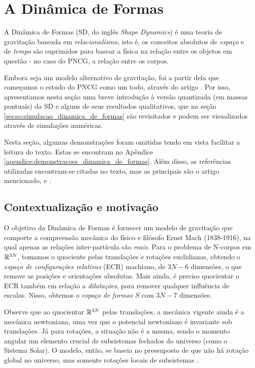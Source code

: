 \section{A Dinâmica de Formas}\label{secao:dinamica_de_formas}
A Dinâmica de Formas (SD, do inglês \textit{Shape Dynamics}) é uma teoria de gravitação baseada em \textit{relacionalismo}, isto é, os conceitos absolutos de \textit{espaço} e de \textit{tempo} são suprimidos para basear a física na relação entre os objetos em questão - no caso do PNCG, a relação entre os corpos.

Embora seja um modelo alternativo de gravitação, foi a partir dela que começamos o estudo do PNCG como um todo, através do artigo \cite{Barbour2014_identification}. Por isso, apresentamos nesta seção uma breve introdução à versão quantizada (em massas pontuais) da SD e alguns de seus resultados qualitativos, que na seção \ref{secao:simulacao_dinamica_de_formas} são revisitados e podem ser visualizados através de simulações numéricas.

Nesta seção, algumas demonstrações foram omitidas tendo em vista facilitar a leitura do texto. Estas se encontram no Apêndice \ref{apendice:demonstracoes_dinamica_de_formas}. Além disso, as referências utilizadas encontram-se citadas no texto, mas as principais são o artigo mencionado, \cite{barbour2013_gravitationaloriginarrowstime} e \cite{Barbour2014_solution}.

\subsection{Contextualização e motivação}

O objetivo da Dinâmica de Formas é fornecer um modelo de gravitação que comporte a compreensão mecânica do físico e filósofo Ernst Mach (1838-1916), na qual apenas as relações inter-partícula são \textit{reais}. Para o problema de N-corpos em $\mathbb{R}^{3N}$, tomamos o quociente pelas translações e rotações euclidianas, obtendo o \textit{espaço de configurações relativas} (ECR) machiano, de $3N-6$ dimensões, o que remove as posições e orientações absolutas. Mais ainda, é preciso quocientar o ECR também em relação a \textit{dilatações}, para remover qualquer influência de escalas. Nisso, obtemos o \textit{espaço de formas} $S$ com $3N-7$ dimensões. 

Observe que ao quocientar $\mathbb{R}^{3N}$ pelas translações, a mecânica vigente ainda é a mecânica newtoniana, uma vez que o potencial newtoniano é invariante sob translações. Já para rotações, a situação não é a mesma, sendo o momento angular um elemento crucial de subsistemas fechados do universo (como o Sistema Solar). O modelo, então, se baseia no pressuposto de que não há rotação global no universo, mas somente rotações locais de subsistemas \citep[264]{Barbour2012_sd_introduction}.

